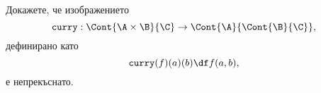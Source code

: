 \begin{problem}
  Докажете, че изображението
  \[\texttt{curry}:\Cont{\A\times \B}{\C} \to \Cont{\A}{\Cont{\B}{\C}},\]
  дефинирано като
  \[\texttt{curry}(f)(a)(b) \df f(a,b),\]
  е непрекъснато.
\end{problem}

